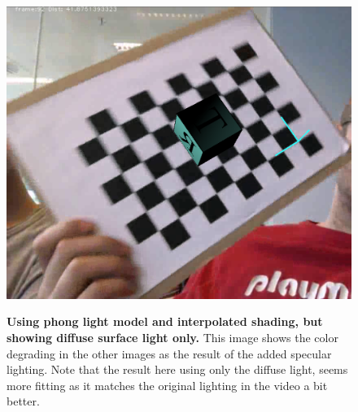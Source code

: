 \begin{figure}[H]
    \includegraphics{pics/phongDiffuseOnly.png}
    \label{fig:EphongDiffuseOnly}
    \caption{\textbf{Using phong light model and interpolated shading, but showing diffuse surface light only.} 
    This image shows the color degrading in the other images as the result of the added specular lighting. Note that the result here using only the diffuse light, seems more fitting as it matches the original lighting in the video a bit better. }
\end{figure}

